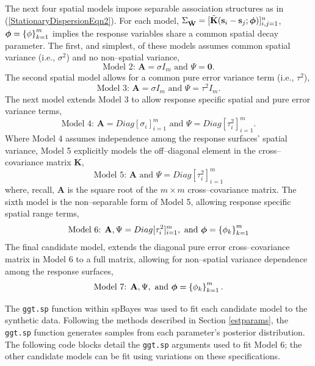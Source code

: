 \documentclass[a4paper]{article}
\newcommand{\bphi}{ \mbox{\boldmath $\phi$}}
\newcommand{\bzero}{\textbf{0}}
\newcommand{\bA}{\textbf{A}}
\newcommand{\bK}{\textbf{K}}
\newcommand{\bs}{\textbf{s}}
\newcommand{\bW}{\textbf{W}}
\let\code=\texttt
\newcommand{\pkg}[1]{{\normalfont\fontseries{b}\selectfont #1}}
\begin{document}
The next four spatial models impose separable association
structures as in (\ref{StationaryDispersionEqn2}). For each model,
$\Sigma_{\tilde{\bW}}=[\tilde{\bK}(\bs_i-\bs_j;\bphi)]_{i,j=1}^{n}$,
$\bphi = \left\lbrace \phi \right\rbrace_{k=1}^{m}$ implies the
response variables share a common spatial decay parameter.  The
first, and simplest, of these models assumes common spatial variance
(i.e., $\sigma^2$) and no non--spatial variance,
\[
\text{Model~2: } \bA=\sigma I_{m}\text{ and } \Psi = \bzero.
\]
The second spatial model allows for a common pure error variance
term (i.e., $\tau^2$),
\[
\text{Model~3: } \bA=\sigma I_{m} \text{ and } \Psi = \tau^2I_m.
\]
The next model extends Model 3 to allow response specific spatial
and pure error variance terms,
\[
\text{Model~4: } \bA=Diag[\sigma_i]_{i=1}^{m}\text{ and } \Psi =
Diag[\tau^2_i]_{i=1}^{m}.
\]
Where Model 4 assumes independence among the response surfaces'
spatial variance, Model 5 explicitly models the off--diagonal
element in the cross--covariance matrix $\bK$,
\[
\text{Model~5: } \bA\text{ and }  \Psi = Diag[\tau^2_i]_{i=1}^{m}
\]
where, recall, $\bA$ is the square root of the $m\times m$
cross--covariance matrix.  The sixth model is the non--separable
form of Model 5, allowing response specific spatial range terms,
\[
\text{Model~6: } \bA, \Psi = Diag[\tau^2_i]_{i=1}^{m}, \text{ and }
\bphi = \left\lbrace \phi_k \right\rbrace_{k=1}^{m}
\]
The final candidate model, extends the diagonal pure error
cross--covariance matrix in Model 6 to a full matrix, allowing for
non--spatial variance dependence among the response surfaces,
\[
\text{Model~7: } \bA, \Psi, \text{ and } \bphi = \left\lbrace \phi_k
\right\rbrace_{k=1}^{m}.
\]

The \code{ggt.sp} function within \pkg{spBayes} was used to fit each
candidate model to the synthetic data.  Following the methods
described in Section \ref{estparams}, the \code{ggt.sp} function
generates samples from each parameter's posterior distribution.
The following code blocks detail the \code{ggt.sp} arguments used to fit
Model 6; the other candidate models can be fit using variations on
these specifications.
\end{document}
